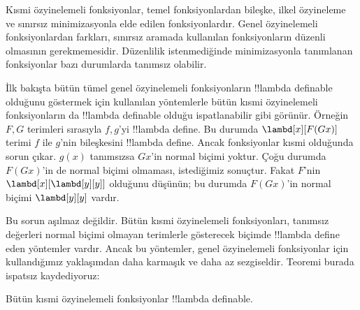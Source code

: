 


Kısmi özyinelemeli fonksiyonlar, temel fonksiyonlardan bileşke, ilkel
özyineleme ve sınırsız minimizasyonla elde edilen fonksiyonlardır. Genel
özyinelemeli fonksiyonlardan farkları, sınırsız aramada kullanılan
fonksiyonların düzenli olmasının gerekmemesidir. Düzenlilik istenmediğinde
minimizasyonla tanımlanan fonksiyonlar bazı durumlarda tanımsız olabilir.

İlk bakışta bütün tümel genel özyinelemeli fonksiyonların !!{lambda definable}
olduğunu göstermek için kullanılan yöntemlerle bütün kısmi özyinelemeli
fonksiyonların da !!{lambda definable} olduğu ispatlanabilir gibi görünür.
Örneğin $F,G$ terimleri sırasıyla $f,g$'yi !!{lambda define}.
Bu durumda $\lambd[x][F(Gx)]$ terimi $f$ ile $g$'nin bileşkesini
!!{lambda define}. Ancak fonksiyonlar kısmi olduğunda sorun çıkar.
$g(x)$ tanımsızsa $Gx$'in normal biçimi yoktur. Çoğu durumda $F(Gx)$'in de
normal biçimi olmaması, istediğimiz sonuçtur. Fakat $F$'nin
$\lambd[x][\lambd[y][y]]$ olduğunu düşünün; bu durumda $F(Gx)$'in normal
biçimi $\lambd[y][y]$ vardır.

Bu sorun aşılmaz değildir. Bütün kısmi özyinelemeli fonksiyonları, tanımsız
değerleri normal biçimi olmayan terimlerle gösterecek biçimde
!!{lambda define} eden yöntemler vardır. Ancak bu yöntemler, genel
özyinelemeli fonksiyonlar için kullandığımız yaklaşımdan daha karmaşık ve daha
az sezgiseldir. Teoremi burada ispatsız kaydediyoruz:

\begin{thm}
  Bütün kısmi özyinelemeli fonksiyonlar !!{lambda definable}.
\end{thm}

